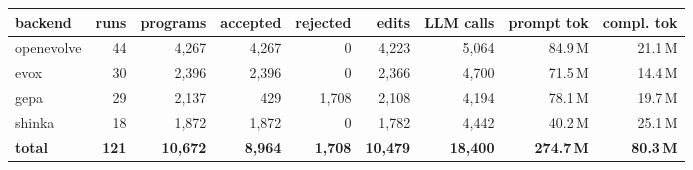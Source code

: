\begin{tabular}{lrrrrrrrr}
\toprule
backend & runs & programs & accepted & rejected & edits & LLM calls & prompt tok & compl. tok \\
\midrule
openevolve & 44 & 4{,}267 & 4{,}267 & 0 & 4{,}223 & 5{,}064 & 84.9\,M & 21.1\,M \\
evox & 30 & 2{,}396 & 2{,}396 & 0 & 2{,}366 & 4{,}700 & 71.5\,M & 14.4\,M \\
gepa & 29 & 2{,}137 & 429 & 1{,}708 & 2{,}108 & 4{,}194 & 78.1\,M & 19.7\,M \\
shinka & 18 & 1{,}872 & 1{,}872 & 0 & 1{,}782 & 4{,}442 & 40.2\,M & 25.1\,M \\
\midrule
\textbf{total} & \textbf{121} & \textbf{10{,}672} & \textbf{8{,}964} & \textbf{1{,}708} & \textbf{10{,}479} & \textbf{18{,}400} & \textbf{274.7\,M} & \textbf{80.3\,M} \\
\bottomrule
\end{tabular}
